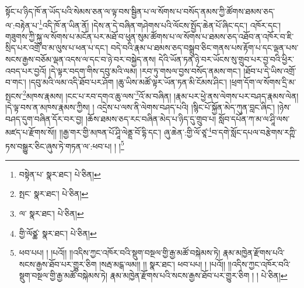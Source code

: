 སྟོང་པ་ཉིད་ཁོ་ན་ཡོད་པའི་སེམས་ཅན་ལ་ལྟ་བས་སྦྱིན་པ་ལ་སོགས་པ་བསོད་ནམས་ཀྱི་ཚོགས་ཐམས་ཅད་ལ་:བརྟེན་པ་\footnote{བསྟེན་པ་  སྣར་ཐང་།  པེ་ཅིན། }འདི་ཁོ་ན་ཡིན་ནོ། །དེས་ན་དེ་བཞིན་གཤེགས་པའི་ལོངས་སྤྱོད་ཆེན་པོ་ཞིང་དང་། འཁོར་དང་། གཟུགས་ཀྱི་སྐུ་ལ་སོགས་པ་མངོན་པར་མཐོ་བ་ཕུན་སུམ་ཚོགས་པ་ལ་སོགས་པ་ཐམས་ཅད་འཐོབ་ན་འཁོར་བ་ཇི་སྲིད་པར་འགྲོ་བ་མ་ལུས་པ་ཕན་པ་དང་། བདེ་བའི་རྣམ་པ་ཐམས་ཅད་བསྒྲུབ་ཅིང་གནས་པས་རྟོག་པ་དང་ལྡན་པས་སངས་རྒྱས་བཅོམ་ལྡན་འདས་ལ་དང་བ་ཉེ་བར་བསྐྱེད་ནས། དེའི་ཡོན་ཏན་ཉེ་བར་ཡོངས་སུ་གྲུབ་པར་བྱ་བའི་ཕྱིར་འབད་པར་བྱའོ། །དེ་ལྟར་བདག་གིས་དབུ་མའི་ལམ། །རབ་ཏུ་གསལ་བྱས་བསོད་ནམས་གང་། །ཐོབ་པ་དེ་ཡིས་འགྲོ་བ་གང་། །དབུ་མའི་ལམ་འདི་ཐོབ་པར་ཤོག །ཆུ་ཡིས་མཚོ་ལྟར་ཡོན་ཏན་མི་ངོམས་ཤིང་། །ཕྲག་དོག་ལ་སོགས་དྲི་མ་སྤངས་\footnote{སྤང་  སྣར་ཐང་།  པེ་ཅིན། }མཁས་རྣམས། །ངང་པ་རབ་དགའ་ཆུ་ལས་\footnote{ལ་  སྣར་ཐང་།  པེ་ཅིན། }འོ་མ་བཞིན། །རྣམ་པར་ཕྱེ་ནས་ལེགས་པར་བཤད་རྣམས་ལེན། །དེ་ལྟ་བས་ན་མཁས་རྣམས་ཀྱིས། །
འདྲེས་པ་ལས་ནི་ལེགས་བཤད་པའི། །སྙིང་པོ་སྐྱོན་མེད་ཀུན་བླང་ཞིང་། །ཉེས་བཤད་དུག་བཞིན་དོར་བར་བྱ། །ཆོས་ཐམས་ཅད་རང་བཞིན་མེད་པ་ཉིད་དུ་གྲུབ་པ། སློབ་དཔོན་ཀ་མ་ལ་ཤཱི་ལས་མཛད་པ་རྫོགས་སོ།། །།རྒྱ་གར་གྱི་མཁན་པོ་ཤཱི་ལེནྡྲ་བོ་དྷི་དང་། ཞུ་ཆེན་:གྱི་ལོ་ཙཱ་\footnote{གྱི་ལོཙྪ་  སྣར་ཐང་།  པེ་ཅིན། }བ་དགེ་སློང་དཔལ་བརྩེགས་རཀྵི་ཏས་བསྒྱུར་ཅིང་ཞུས་ཏེ་གཏན་ལ་:ཕབ་པ། ། །\footnote{ཕབ་པཔ། ། །པའོ།། །།འདིས་ཀྱང་འཁོར་བའི་སྡུག་བསྔལ་གྱི་རྒྱ་མཚོ་བསྐེམས་ཏེ། རྣམ་མཁྱེན་རྫོགས་པའི་སངས་རྒྱས་ཐོབ་པར་གྱུར་ཅིག །སརྦ་མངྒ་ལམ།། །།  སྣར་ཐང་། ཕབ་པཔ། ། །པའོ།། །།འདིས་ཀྱང་འཁོར་བའི་སྡུག་བསྔལ་གྱི་རྒྱ་མཚོ་བསྐེམས་ཏེ། རྣམ་མཁྱེན་རྫོགས་པའི་སངས་རྒྱས་ཐོབ་པར་གྱུར་ཅིག ། །  པེ་ཅིན། }